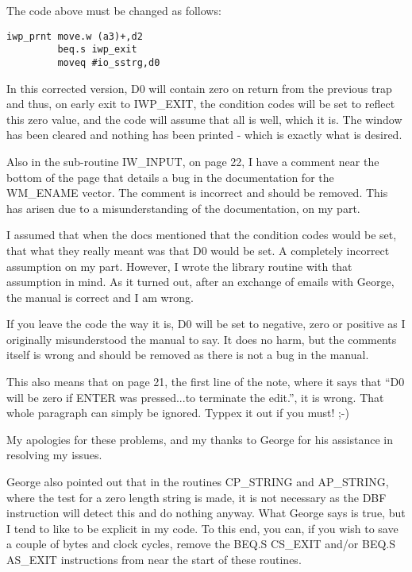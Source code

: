 The code above must be changed as follows:

\begin{lstlisting}[firstnumber=1,]
iwp_prnt move.w (a3)+,d2
         beq.s iwp_exit
         moveq #io_sstrg,d0
\end{lstlisting}

In this corrected version, D0 will contain zero on return from the
    previous trap and thus, on early exit to IWP\_EXIT,
    the condition codes will be set to reflect this zero value, and the code
    will assume that all is well, which it is. The window has been cleared and
    nothing has been printed -{} which is exactly what is desired.

Also in the sub-{}routine IW\_INPUT, on page 22, I
    have a comment near the bottom of the page that details a bug in the
    documentation for the WM\_ENAME vector. The comment is
    incorrect and should be removed. This has arisen due to a misunderstanding
    of the documentation, on my part.

I assumed that when the docs mentioned that the condition codes
    would be set, that what they really meant was that D0 would be set. A
    completely incorrect assumption on my part. However, I wrote the library
    routine with that assumption in mind. As it turned out, after an exchange
    of emails with George, the manual is correct and I am wrong.

If you leave the code the way it is, D0 will be set to negative,
    zero or positive as I originally misunderstood the manual to say. It does
    no harm, but the comments itself is wrong and should be removed as there
    is not a bug in the manual.

This also means that on page 21, the first line of the note, where
    it says that ``D0 will be zero if ENTER was pressed...to terminate the
    edit.'', it is wrong. That whole paragraph can simply be ignored. Typpex it
    out if you must! ;-{})

My apologies for these problems, and my thanks to George for his
    assistance in resolving my issues.

George also pointed out that in the routines
 CP\_STRING and AP\_STRING, where
    the test for a zero length string is made, it is not necessary as the DBF
    instruction will detect this and do nothing anyway. What George says is
    true, but I tend to like to be explicit in my code. To this end, you can,
    if you wish to save a couple of bytes and clock cycles, remove the BEQ.S
    CS\_EXIT and/or BEQ.S AS\_EXIT instructions from near the start of these
    routines.

